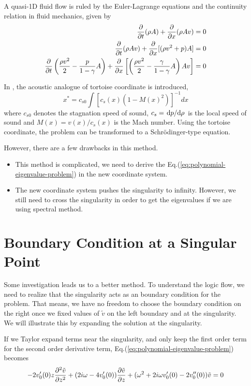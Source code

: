 A quasi-1D fluid flow is ruled by the Euler-Lagrange equations and the continuity relation in fluid mechanics, given by
\begin{align} \label{eq:euler-lagrange}
  \pdv{t}(\rho A) + \pdv{x}(\rho A v) &= 0 \\
  \pdv{t}(\rho A v) + \pdv{x}[(\rho v^2 + p)A] &= 0 \\
  \pdv{t}\left(\frac{\rho v^2}{2} - \frac{p}{1-\gamma}A\right) +
  \pdv{x}\left[ \left(\frac{\rho v^2}{2} - \frac{\gamma}{1-\gamma}A\right)Av \right] &= 0
\end{align}

In \cite{da_rocha_black_2017, furuhashi_simulation_2006}, the acoustic analogue of tortoise coordinate is introduced,
\[ x^* = c_{s0}\int [c_s(x)(1-M(x)^2)]^{-1} dx \]
where $c_{s0}$ denotes the stagnation speed of sound, $c_s = \dv*{p}{\rho}$ is the local speed of sound and $M(x)= v(x)/c_s(x)$ is the Mach number. Using the tortoise coordinate, the problem can be transformed to a Schr{\"o}dinger-type equation. 

However, there are a few drawbacks in this method.
\begin{itemize}
  \item This method is complicated, we need to derive the Eq.(\ref{eq:polynomial-eigenvalue-problem}) in the new coordinate system.
  \item The new coordinate system pushes the singularity to infinity. However, we still need to cross the singularity in order to get the eigenvalues if we are using spectral method. 
\end{itemize}


\section{Boundary Condition at a Singular Point}
Some investigation leads us to a better method. To understand the logic flow, we need to realize that the singularity acts as an boundary condition for the problem. That means, we have no freedom to choose the boundary condition on the right once we fixed values of $\tilde{v}$ on the left boundary and at the singularity. We will illustrate this by expanding the solution at the singularity.

If we Taylor expand terms near the singularity, and only keep the first order term for the second order derivative term, Eq.(\ref{eq:polynomial-eigenvalue-problem}) becomes
\[ - 2v_0'(0)z\pdv[2]{\tilde{v}}{z}
+ (2i\omega - 4v_0'(0))\pdv{\tilde{v}}{z} 
+ (\omega^2 + 2i\omega v_0'(0) - 2v_0''(0))\tilde{v}
= 0 \]

